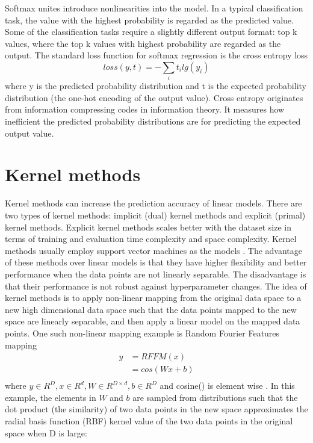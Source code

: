 Softmax unites introduce nonlinearities into the model.
In a typical classification task, the value with the highest probability is regarded as the predicted value.
Some of the classification tasks require a slightly different output format: top k values, where the top k values with highest probability are regarded as the output.
The standard loss function for softmax regression is the cross entropy loss
\[loss(y, t) = - \sum_i t_i lg(y_i)\]
where y is the predicted probability distribution and t is the expected probability distribution (the one-hot encoding of the output value).
Cross entropy originates from information compressing codes in information theory.
It measures how inefficient the predicted probability distributions are for predicting the expected output value.

\section{Kernel methods}
Kernel methods can increase the prediction accuracy of linear models.
There are two types of kernel methods: implicit (dual) kernel methods and explicit (primal) kernel methods.
Explicit kernel methods scales better with the dataset size in terms of training and evaluation time complexity and space complexity.
Kernel methods usually employ support vector machines as the models \cite{hofmann2008kernel}.
The advantage of these methods over linear models is that they have higher flexibility and better performance when the data points are not linearly separable.
The disadvantage is that their performance is not robust against hyperparameter changes.
The idea of kernel methods is to apply non-linear mapping from the original data space to a new high dimensional data space such that the data points mapped to the new space are linearly separable, and then apply a linear model on the mapped data points.
One such non-linear mapping example is Random Fourier Features mapping
\begin{align*}
	y 
	&= RFFM(x) \\
	&= cos(Wx + b) \\
\end{align*}
where $ y \in R^D, x \in R^d, W \in R^{D \times d}, b \in R^D $ and cosine() is element wise \cite{rahimi2008random}.
In this example, the elements in $ W $ and $ b $ are sampled from distributions such that the dot product (the similarity) of two data points in the new space approximates the radial basis function (RBF) kernel value of the two data points in the original space when D is large:
